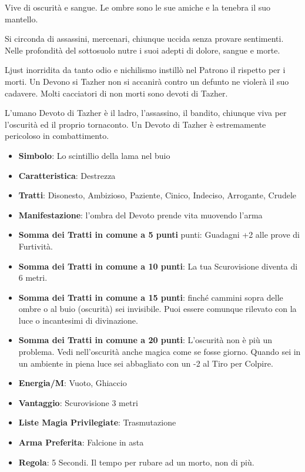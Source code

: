 \begin{multicols}{2}
Vive di oscurità e sangue. Le ombre sono le sue amiche e la tenebra il suo mantello.

Si circonda di assassini, mercenari, chiunque uccida senza provare sentimenti. Nelle profondità del sottosuolo nutre i suoi adepti di dolore, sangue e morte.

Ljust inorridita da tanto odio e nichilismo instillò nel Patrono il rispetto per i morti. Un Devono si Tazher non si accanirà contro un defunto ne violerà il suo cadavere. Molti cacciatori di non morti sono devoti di Tazher.

L'umano Devoto di Tazher è il ladro, l'assassino, il bandito, chiunque viva per l'oscurità ed il proprio tornaconto. Un Devoto di Tazher è estremamente pericoloso in combattimento.

\begin{itemize}[leftmargin=*] \setlength{\itemsep}{0pt}
\item \textbf{Simbolo}: Lo scintillio della lama nel buio
\item \textbf{Caratteristica}: Destrezza
\item \textbf{Tratti}: Disonesto, Ambizioso, Paziente, Cinico, Indeciso, Arrogante, Crudele
\item \textbf{Manifestazione}: l'ombra del Devoto prende vita muovendo l'arma
\item \textbf{Somma dei Tratti in comune a 5 punti} punti: Guadagni +2 alle prove di Furtività.
\item \textbf{Somma dei Tratti in comune a 10 punti}: La tua Scurovisione diventa di 6 metri.
\item \textbf{Somma dei Tratti in comune a 15 punti}: finché cammini sopra delle ombre o al buio (oscurità) sei invisibile. Puoi essere comunque rilevato con la luce o incantesimi di divinazione.
\item \textbf{Somma dei Tratti in comune a 20 punti}: L'oscurità non è più un problema. Vedi nell'oscurità anche magica come se fosse giorno. Quando sei in un ambiente in piena luce sei abbagliato con un -2 al Tiro per Colpire.
\item \textbf{Energia/M}: Vuoto, Ghiaccio
\item \textbf{Vantaggio}: Scurovisione 3 metri
\item \textbf{Liste Magia Privilegiate}: Trasmutazione
\item \textbf{Arma Preferita}: Falcione in asta
\item \textbf{Regola}: 5 Secondi. Il tempo per rubare ad un morto, non di più.
\end{itemize}


\end{multicols}
